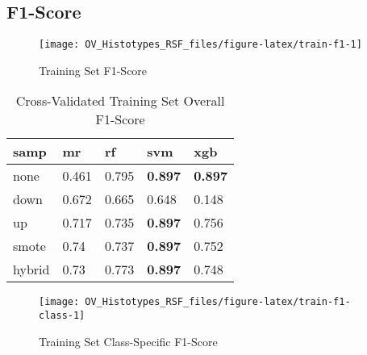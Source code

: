 \documentclass[
]{report}
\begin{document}
\hypertarget{f1-score}{%
\subsection{F1-Score}\label{f1-score}}

\begin{figure}[H]

{\centering \texttt{[image: OV\_Histotypes\_RSF\_files/figure-latex/train-f1-1]} 

}

\caption{Training Set F1-Score}\label{fig:train-f1}
\end{figure}

\begin{table}

\caption{\label{tab:train-f1-table}Cross-Validated Training Set Overall F1-Score}
\centering
\begin{tabular}[t]{l|l|l|l|l}
\hline
samp & mr & rf & svm & xgb\\
\hline
none & 0.461 & 0.795 & \textbf{0.897} & \textbf{0.897}\\
\hline
down & 0.672 & 0.665 & 0.648 & 0.148\\
\hline
up & 0.717 & 0.735 & \textbf{0.897} & 0.756\\
\hline
smote & 0.74 & 0.737 & \textbf{0.897} & 0.752\\
\hline
hybrid & 0.73 & 0.773 & \textbf{0.897} & 0.748\\
\hline
\end{tabular}
\end{table}

\begin{figure}[H]

{\centering \texttt{[image: OV\_Histotypes\_RSF\_files/figure-latex/train-f1-class-1]} 

}

\caption{Training Set Class-Specific F1-Score}\label{fig:train-f1-class}
\end{figure}
\end{document}
